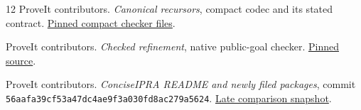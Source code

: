 \documentclass[11pt,letterpaper]{article}
\begin{document}
\begin{thebibliography}{12}
 ProveIt contributors.
\emph{Canonical recursors}, compact codec and its stated contract.
\href{https://github.com/VladimirReshetnikov/ProveIt/tree/443cff49563457a48ee0f663012d56c4bdb58fa0/Logic/PrimitiveRecursiveArithmetic/ConciseIPRA/Research/canonical_recursors/compact}{Pinned compact checker files}.

 ProveIt contributors.
\emph{Checked refinement}, native public-goal checker.
\href{https://github.com/VladimirReshetnikov/ProveIt/blob/443cff49563457a48ee0f663012d56c4bdb58fa0/Logic/PrimitiveRecursiveArithmetic/ConciseIPRA/Research/checked_refinement/code/checker_native.py}{Pinned source}.

 ProveIt contributors.
\emph{ConciseIPRA README and newly filed packages}, commit
\texttt{56aafa39cf53a47dc4ae9f3a030fd8ac279a5624}.
\href{https://github.com/VladimirReshetnikov/ProveIt/tree/56aafa39cf53a47dc4ae9f3a030fd8ac279a5624/Logic/PrimitiveRecursiveArithmetic/ConciseIPRA}{Late comparison snapshot}.
\end{thebibliography}
\end{document}
